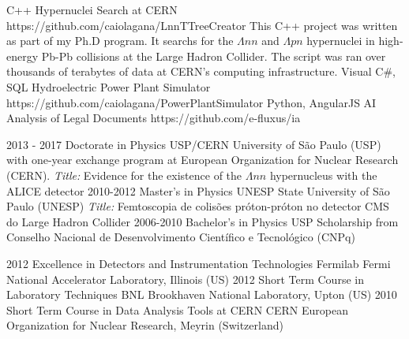 \documentclass[9pt]{developercv} %
\begin{document}

\vspace{10 pt}
\begin{entrylist}
	\entry
		{C++}
		{Hypernuclei Search at CERN}
		{https://github.com/caiolagana/LnnTTreeCreator}
		{This C++ project was written as part of my Ph.D program. It searchs for the $\Lambda nn$ and $\Lambda pn$ hypernuclei in high-energy Pb-Pb collisions at the Large Hadron Collider. The script was ran over thousands of terabytes of data at CERN's computing infrastructure.}
    \entry
		{Visual C\#, SQL}
		{Hydroelectric Power Plant Simulator}
		{https://github.com/caiolagana/PowerPlantSimulator}
		{%
        \lipsum[1][1-3]}
    \entry
		{Python, AngularJS}
		{AI Analysis of Legal Documents}
		{https://github.com/e-fluxus/ia}
		{%
        \lipsum[1][1-3]}
\end{entrylist}


\vspace{-10 pt}
\begin{entrylist}
    \entry
		{2013 - 2017}
		{Doctorate in Physics}
		{USP/CERN}
		{University of São Paulo (USP) with one-year exchange program at European Organization for Nuclear Research (CERN). {\it Title:} Evidence for the existence of the $\Lambda nn$ hypernucleus with the ALICE detector}
    \entry
		{2010-2012}
		{Master's in Physics}
		{UNESP}
		{State University of São Paulo (UNESP) {\it Title:} Femtoscopia de colisões próton-próton no detector CMS do Large Hadron Collider}
	\entry
		{2006-2010}
		{Bachelor's in Physics}
		{USP}
		{Scholarship from Conselho Nacional de Desenvolvimento Científico e Tecnológico (CNPq)}
\end{entrylist}


\vspace{-10 pt}
\begin{entrylist}
    \entry
		{2012}
		{Excellence in Detectors and Instrumentation Technologies}
		{Fermilab}
		{Fermi National Accelerator Laboratory, Illinois (US)}
	\entry
		{2012}
		{Short Term Course in Laboratory Techniques}
		{BNL}
		{Brookhaven National Laboratory, Upton (US)}
	\entry
		{2010}
		{Short Term Course in Data Analysis Tools at CERN}
		{CERN}
		{European Organization for Nuclear Research, Meyrin (Switzerland)}
\end{entrylist}
\end{document}
